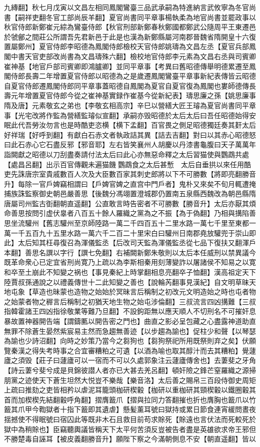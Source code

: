 九縳翻】秋七月戊寅以文昌左相同鳳閣鸞臺三品武承嗣為特進納言武攸寧為冬官尚書【嗣祥吏翻冬官工部尚辰羊翻】夏官尚書同平章事楊執柔為地官尚書並罷政事以秋官侍郎新鄭崔元綜為鸞臺侍郎【秋官刑部新鄭春秋鄭國都鄭武公隨周平王東遷邑於虢鄶之間莊公所謂吾先君新邑于此是也漢為新鄭縣屬河南郡晉魏省隋開皇十六復置屬鄭州】夏官侍郎李昭德為鳳閣侍郎檢校天官侍郎姚璹為文昌左丞【夏官兵部鳳閣中書天官吏部改尚書為文昌璹殊六翻】檢校地官侍郎李元素為文昌右丞與司賓卿崔神基【地官戶部司賓卿即鴻臚卿】並同平章事【考異曰舊昭德傳舉明德累遷至鳳閣侍郎長壽二年增置夏官侍郎以昭德為之是歲遷鳳閣鸞臺平章事新紀表傳皆云昭德自夏官侍郎遷鳳閣侍郎同平章事蓋昭德自鳳閣為夏官自夏官復為鳳閣也婁師德傳長壽元年增置夏官侍郎今從之崔神基實録作崔基今從新紀表】璹思廉之孫【姚思廉事隋及唐】元素敬玄之弟也【李敬玄相高宗】辛巳以營繕大匠王璿為夏官尚書同平章事【光宅改將作監為營繕監璿似宣翻】承嗣亦毁昭德於太后太后曰吾任昭德始得安眠此代吾勞汝勿言也是時酷吏恣横【横下孟翻】百官畏之側足昭德獨廷奏其姧太后好祥瑞【好呼到翻】有獻白石赤文者執政詰其異【詰去吉翻】對曰以其赤心昭德怒曰此石赤心它石盡反邪【邪音耶】左右皆笑襄州人胡慶以丹漆書龜腹曰天子萬萬年詣闕獻之昭德以刀刮盡奏請付法太后曰此心亦無惡命釋之太后習猫使與鸚鵡共處【處昌呂翻】出示百官傳觀未遍猫饑鸚鵡食之太后甚慙　太后自垂拱以來任用酷吏先誅唐宗室貴戚數百人次及大臣數百家其刺史郎將以下不可勝數【將即亮翻勝音升】每除一官戶婢竊相謂曰【戶婢官婢之直宫中門戶者】鬼朴又來矣不旬月輒遭掩捕族誅監察御史朝邑嚴善思【後魏分馮翊置澄城郡仍置南五泉縣西魏改為朝邑縣隋唐屬司州監古衘翻朝直遥翻】公直敢言時告密者不可勝數【勝音升】太后亦厭其煩命善思按問引虚伏辠者八百五十餘人羅織之黨為之不振【為于偽翻】乃相與搆陷善思坐流驩州【舊志驩州至京師陸路一萬二千四百五十二里水路一萬七千里至東都一萬一千五百九十五里水路一萬六千二百二十里宋白曰驩州日南郡堯放驩兜于崇山即此】太后知其枉尋復召為渾儀監丞【后改司天監為渾儀監丞從七品下復扶又翻渾戶本翻】善思名譔以字行【譔七免翻】右補闕新鄭朱敬則以太后本任威刑以禁異議今既革命衆心已定宜省刑尚寛乃上疏以為李斯相秦用刻薄變詐以屠諸侯不知易之以寛和卒至土崩此不知變之祸也【事見秦紀上時掌翻相息亮翻卒子恤翻】漢高祖定天下陸賈叔孫通說之以禮義傳世十二此知變之善也【說輪芮翻事見漢紀】自文明草昧天地屯象【草造也昧蒙也造物之始始於冥昧言后稱制之初改元文明造始之時也屯者物之始蒙者物之稺言后稱制之初猶天地生物之始屯涉倫翻】三叔流言四凶搆難【三叔指韓霍諸王四凶指徐敬業等難乃旦翻】不設鉤距無以應天順人不切刑名不可摧奸息暴故置神器開告端【謂鑄匭以開告密之門也】曲直之影必呈包藏之心盡露神道助直無罪不除蒼生晏然紫宸易主然而急趨無善迹【以步趨為諭也】促柱少和聲【以琴瑟為諭也少詩沼翻】向時之妙策乃當今之芻狗也【芻狗祭祀所用既祭則弃之矣】伏願覽秦漢之得失考時事之合宜審糟粕之可遺【以酒為喻也取其醇汁而去其糟粕】覺蘧廬之須毁【莊子曰蘧廬可以一宿而不可以久處郭象注云蘧廬傳舍也】去萋斐之牙角【詩云萋兮斐兮成是貝錦彼譛人者亦已大甚去羌呂翻】頓奸險之鋒芒窒羅織之源掃朋黨之迹使天下蒼生坦然大悦豈不樂哉【樂音洛】太后善之賜帛三百段侍御史周矩上疏曰推劾之吏皆相矜以虐泥耳籠頭枷研楔轂【枷研以重枷研其頸楔轂以鐵圈轂其首而加楔楔先結翻轂呼角翻】摺膺籖爪【摺與拉同力答翻摧也折也膺胸也籖爪以竹籖其爪甲今鞫獄者十指下籖即其遺虐】懸髪薰耳號曰獄持或累日節食連宵緩問晝夜揺撼使不得眠號曰宿囚此等既非木石且救目前苟求賖死【賖遠也言伏法而死較死於獄中為稍賖也】臣竊聽輿議皆稱天下太平何苦須反豈被告者盡是英䧺欲求帝王邪但不勝楚毒自誣耳【被皮義翻勝音升】願陛下察之今滿朝側息不安【朝直遥翻】皆以